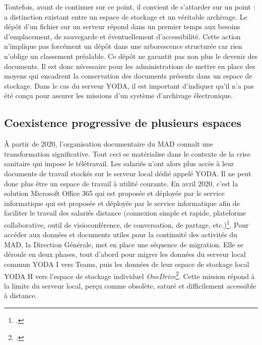 Toutefois, avant de continuer sur ce point, il convient de s’attarder sur un point : a distinction existant entre un espace de stockage et un véritable archivage. Le dépôt d’un fichier sur un serveur répond  dans un premier temps aux besoins d’emplacement, de sauvegarde et éventuellement d’accessibilité. Cette action n’implique pas forcément un dépôt dans une arborescence structurée car rien n’oblige un classement préalable. Ce dépôt ne garantit pas non plus le devenir des documents. Il est donc nécessaire pour les administrations de mettre en place des moyens qui encadrent la conservation des documents présents dans un espace de stockage. Dans le cas du serveur YODA, il est important d’indiquer qu’il n’a pas été conçu pour assurer les missions d’un système d’archivage électronique.


\subsection*{Coexistence progressive de plusieurs espaces}

À partir de 2020, l’organisation documentaire du MAD connaît une transformation significative. Tout ceci se matérialise dans le contexte de la crise sanitaire qui impose le télétravail. Les salariés n’ont alors plus accès à leur documents de travail stockés sur le serveur local dédié appelé YODA. Il ne peut donc plus être un espace de travail à utilité courante. En avril 2020, c'est la solution Microsoft Office 365 qui est proposée et déployée par le service informatique qui est proposée et déployée par le service informatique afin de faciliter le travail des salariés  distance (connexion simple et rapide, plateforme collaborative, outil de visioconférence, de conversation, de partage, etc.)\footcite[version 4, p.~4]{bomel-dion-note-cadrage}. Pour accéder aux données et documents utiles pour la continuité des activités du MAD, la Direction Générale, met en place une séquence de migration. Elle se déroule en deux phases, tout d’abord pour migrer les données du serveur local commun YODA I vers Teams, puis les données de leur espace de stockage local YODA H vers l’espace de stockage individuel \textit{OneDrive}\footcite[version 4, p.~4]{bomel-dion-note-cadrage}. Cette mission répond à la limite du serveur local, perçu comme obsolète, saturé et difficilement accessible à distance.\\[0.1cm]

